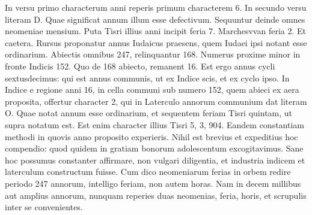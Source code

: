 In versu primo characterum anni reperis primum characterem
6.
In secundo versu literam \textsc{D}.
Quae significat annum illum esse
defectivum.
Sequuntur deinde omnes neomeniae mensium.
Puta Tisri
illius anni incipit feria 7.
Marchesvvan feria 2.
Et caetera.
Rursus
proponatur annus Iudaicus praesens, quem Iudaei ipsi notant esse ordinarium.
%
Abiectis omnibus 247, relinquantur 168.
Numerus proxime
minor in fronte Indicis 152.
Quo de 168 abiecto, remanent 16.
Est ergo annus cycli sextusdecimus: qui est annus communis, ut
ex Indice scis, et ex cyclo ipso.
In Indice e regione anni 16, in cella
communi sub numero 152, quem abieci ex aera proposita, offertur
character 2, qui in Laterculo annorum communium dat literam \textsc{O}.
Quae notat annum esse ordinarium, et sequentem feriam Tisri quintam,
ut supra notatum est.
Est enim character illius Tisri 5, 3, 904.
Eandem constantiam methodi in quovis anno proposito experieris.
Nihil est brevius et expeditius hoc compendio: quod quidem in gratiam
bonorum adolescentum excogitavimus.
Sane hoc possumus
constanter affirmare, non vulgari diligentia, et industria indicem et
laterculum constructum fuisse.
Cum dico neomeniarum ferias in
orbem redire periodo 247 annorum, intelligo feriam, non autem
horas.
Nam in decem millibus aut amplius annorum, nunquam reperies
duas neomenias, feria, horis, et scrupulis inter se convenientes.
\vspace*{\fill}
%
